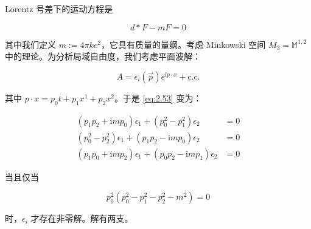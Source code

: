 Lorentz 号差下的运动方程是

\begin{equation}
  d\ast F-mF=0
  \tag{2.53}
  \label{eq:2.53}
\end{equation}

其中我们定义 $m:=4\pi ke^{2}$，它具有质量的量纲。考虑 Minkowski 空间 $M_3=\mathbb{M}^{1,2}$ 中的理论。为分析局域自由度，我们考虑平面波解：

\begin{equation}
  A=\epsilon_i(\vec p)e^{\mathrm{i}p\cdot x}+\text{c.c.}
  \tag{2.54}
  \label{eq:2.54}
\end{equation}

其中 $p\cdot x=p_0t+p_1x^{1}+p_2x^{2}$。于是 \eqref{eq:2.53} 变为：

\begin{equation}
  \begin{aligned}
    (p_1p_2+\mathrm{i}mp_0)\epsilon_1+(p_0^{2}-p_1^{2})\epsilon_2 &=0\\
    (p_0^{2}-p_2^{2})\epsilon_1+(p_1p_2-\mathrm{i}mp_0)\epsilon_2 &=0\\
    (p_1p_0+\mathrm{i}mp_2)\epsilon_1+(p_0p_2-\mathrm{i}mp_1)\epsilon_2 &=0
  \end{aligned}
  \tag{2.55}
  \label{eq:2.55}
\end{equation}

当且仅当

\begin{equation}
  p_0^{2}\left(p_0^{2}-p_1^{2}-p_2^{2}-m^{2}\right)=0
  \tag{2.56}
  \label{eq:2.56}
\end{equation}

时，$\epsilon_i$ 才存在非零解。解有两支。

